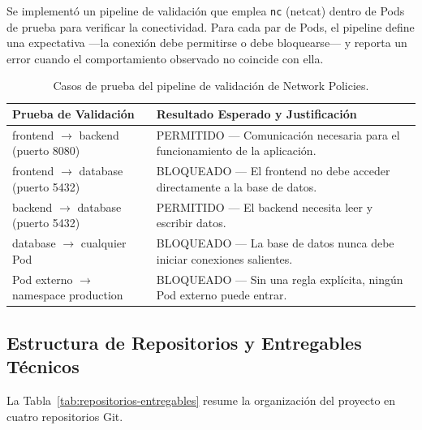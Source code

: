Se implementó un pipeline de validación que emplea \texttt{nc} (netcat) dentro de Pods de prueba para verificar la conectividad. Para cada par de Pods, el pipeline define una expectativa ---la conexión debe permitirse o debe bloquearse--- y reporta un error cuando el comportamiento observado no coincide con ella.

\begin{table}[htbp]
\centering
\scriptsize
\renewcommand{\arraystretch}{1.25}
\setlength{\tabcolsep}{4pt}
\caption{Casos de prueba del pipeline de validación de Network Policies.}
\label{tab:validacion-network-policies}
\begin{tabularx}{\textwidth}{|p{5cm}|Y|}
\hline
\textbf{Prueba de Validación} & \textbf{Resultado Esperado y Justificación} \\
\hline
frontend $\rightarrow$ backend (puerto 8080) & PERMITIDO --- Comunicación necesaria para el funcionamiento de la aplicación. \\
\hline
frontend $\rightarrow$ database (puerto 5432) & BLOQUEADO --- El frontend no debe acceder directamente a la base de datos. \\
\hline
backend $\rightarrow$ database (puerto 5432) & PERMITIDO --- El backend necesita leer y escribir datos. \\
\hline
database $\rightarrow$ cualquier Pod & BLOQUEADO --- La base de datos nunca debe iniciar conexiones salientes. \\
\hline
Pod externo $\rightarrow$ namespace production & BLOQUEADO --- Sin una regla explícita, ningún Pod externo puede entrar. \\
\hline
\end{tabularx}
\end{table}

\subsection{Estructura de Repositorios y Entregables Técnicos}

La Tabla~\ref{tab:repositorios-entregables} resume la organización del proyecto en cuatro repositorios Git.

